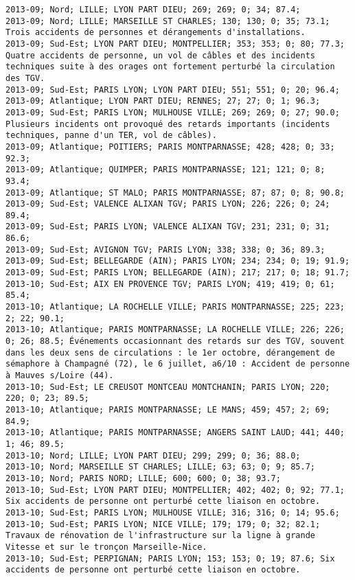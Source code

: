 \documentclass{article}
\begin{document}
\begin{Verbatim}[commandchars=\\\{\}]
2013-09; Nord; LILLE; LYON PART DIEU; 269; 269; 0; 34; 87.4; 
2013-09; Nord; LILLE; MARSEILLE ST CHARLES; 130; 130; 0; 35; 73.1; Trois accidents de personnes et dérangements d'installations.
2013-09; Sud-Est; LYON PART DIEU; MONTPELLIER; 353; 353; 0; 80; 77.3; Quatre accidents de personne, un vol de câbles et des incidents techniques suite à des orages ont fortement perturbé la circulation des TGV.
2013-09; Sud-Est; PARIS LYON; LYON PART DIEU; 551; 551; 0; 20; 96.4; 
2013-09; Atlantique; LYON PART DIEU; RENNES; 27; 27; 0; 1; 96.3; 
2013-09; Sud-Est; PARIS LYON; MULHOUSE VILLE; 269; 269; 0; 27; 90.0; Plusieurs incidents ont provoqué des retards importants (incidents techniques, panne d'un TER, vol de câbles).
2013-09; Atlantique; POITIERS; PARIS MONTPARNASSE; 428; 428; 0; 33; 92.3; 
2013-09; Atlantique; QUIMPER; PARIS MONTPARNASSE; 121; 121; 0; 8; 93.4; 
2013-09; Atlantique; ST MALO; PARIS MONTPARNASSE; 87; 87; 0; 8; 90.8; 
2013-09; Sud-Est; VALENCE ALIXAN TGV; PARIS LYON; 226; 226; 0; 24; 89.4; 
2013-09; Sud-Est; PARIS LYON; VALENCE ALIXAN TGV; 231; 231; 0; 31; 86.6; 
2013-09; Sud-Est; AVIGNON TGV; PARIS LYON; 338; 338; 0; 36; 89.3; 
2013-09; Sud-Est; BELLEGARDE (AIN); PARIS LYON; 234; 234; 0; 19; 91.9; 
2013-09; Sud-Est; PARIS LYON; BELLEGARDE (AIN); 217; 217; 0; 18; 91.7; 
2013-10; Sud-Est; AIX EN PROVENCE TGV; PARIS LYON; 419; 419; 0; 61; 85.4; 
2013-10; Atlantique; LA ROCHELLE VILLE; PARIS MONTPARNASSE; 225; 223; 2; 22; 90.1; 
2013-10; Atlantique; PARIS MONTPARNASSE; LA ROCHELLE VILLE; 226; 226; 0; 26; 88.5; Événements occasionnant des retards sur des TGV, souvent dans les deux sens de circulations : le 1er octobre, dérangement de sémaphore à Champagné (72), le 6 juillet, a6/10 : Accident de personne à Mauves s/Loire (44).
2013-10; Sud-Est; LE CREUSOT MONTCEAU MONTCHANIN; PARIS LYON; 220; 220; 0; 23; 89.5; 
2013-10; Atlantique; PARIS MONTPARNASSE; LE MANS; 459; 457; 2; 69; 84.9; 
2013-10; Atlantique; PARIS MONTPARNASSE; ANGERS SAINT LAUD; 441; 440; 1; 46; 89.5; 
2013-10; Nord; LILLE; LYON PART DIEU; 299; 299; 0; 36; 88.0; 
2013-10; Nord; MARSEILLE ST CHARLES; LILLE; 63; 63; 0; 9; 85.7; 
2013-10; Nord; PARIS NORD; LILLE; 600; 600; 0; 38; 93.7; 
2013-10; Sud-Est; LYON PART DIEU; MONTPELLIER; 402; 402; 0; 92; 77.1; Six accidents de personne ont perturbé cette liaison en octobre.
2013-10; Sud-Est; PARIS LYON; MULHOUSE VILLE; 316; 316; 0; 14; 95.6; 
2013-10; Sud-Est; PARIS LYON; NICE VILLE; 179; 179; 0; 32; 82.1; Travaux de rénovation de l'infrastructure sur la ligne à grande Vitesse et sur le tronçon Marseille-Nice.
2013-10; Sud-Est; PERPIGNAN; PARIS LYON; 153; 153; 0; 19; 87.6; Six accidents de personne ont perturbé cette liaison en octobre.

\end{Verbatim}
\end{document}
